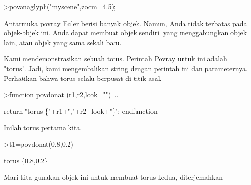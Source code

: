\documentclass[a4paper,10pt]{article}
\begin{document}
\begin{eulernotebook}
\begin{eulercomment}
\begin{eulercomment}
\begin{eulercomment}
\begin{eulercomment}
\begin{eulercomment}
\begin{eulercomment}
\begin{eulercomment}
\begin{eulercomment}
\begin{eulercomment}
\begin{eulercomment}
\begin{eulercomment}
\begin{eulercomment}
\begin{eulercomment}
\begin{eulercomment}
\begin{eulercomment}
\begin{eulercomment}
\begin{eulercomment}
\begin{eulercomment}
\begin{eulercomment}
\begin{eulercomment}
\begin{eulercomment}
\begin{eulercomment}
\begin{eulercomment}
\begin{eulercomment}
\begin{eulercomment}
\begin{eulercomment}
\begin{eulercomment}
\begin{eulercomment}
\begin{eulercomment}
\begin{eulercomment}
\begin{eulercomment}
\begin{eulercomment}
\begin{eulercomment}
\begin{eulercomment}
\begin{eulercomment}
\begin{eulercomment}
\begin{eulercomment}
\begin{eulercomment}
\begin{eulercomment}
\begin{eulercomment}
\begin{eulerprompt}
>povanaglyph("myscene",zoom=4.5);
\end{eulerprompt}
\begin{eulercomment}
Antarmuka povray Euler berisi banyak objek. Namun, Anda tidak terbatas
pada objek-objek ini. Anda dapat membuat objek sendiri, yang
menggabungkan objek lain, atau objek yang sama sekali baru.

Kami mendemonstrasikan sebuah torus. Perintah Povray untuk ini adalah
"torus". Jadi, kami mengembalikan string dengan perintah ini dan
parameternya. Perhatikan bahwa torus selalu berpusat di titik asal.
\end{eulercomment}
\begin{eulerprompt}
>function povdonat (r1,r2,look="") ...
\end{eulerprompt}
\begin{eulerudf}
    return "torus \{"+r1+","+r2+look+"\}";
  endfunction
\end{eulerudf}
\begin{eulercomment}
Inilah torus pertama kita.
\end{eulercomment}
\begin{eulerprompt}
>t1=povdonat(0.8,0.2)
\end{eulerprompt}
\begin{euleroutput}
  torus \{0.8,0.2\}
\end{euleroutput}
\begin{eulercomment}
Mari kita gunakan objek ini untuk membuat torus kedua, diterjemahkan

\end{eulercomment}
\end{eulercomment}
\end{eulercomment}
\end{eulercomment}
\end{eulercomment}
\end{eulercomment}
\end{eulercomment}
\end{eulercomment}
\end{eulercomment}
\end{eulercomment}
\end{eulercomment}
\end{eulercomment}
\end{eulercomment}
\end{eulercomment}
\end{eulercomment}
\end{eulercomment}
\end{eulercomment}
\end{eulercomment}
\end{eulercomment}
\end{eulercomment}
\end{eulercomment}
\end{eulercomment}
\end{eulercomment}
\end{eulercomment}
\end{eulercomment}
\end{eulercomment}
\end{eulercomment}
\end{eulercomment}
\end{eulercomment}
\end{eulercomment}
\end{eulercomment}
\end{eulercomment}
\end{eulercomment}
\end{eulercomment}
\end{eulercomment}
\end{eulercomment}
\end{eulercomment}
\end{eulercomment}
\end{eulercomment}
\end{eulercomment}
\end{eulercomment}
\end{eulernotebook}
\end{document}
